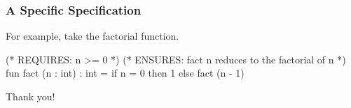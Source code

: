 \documentclass[aspectratio=169]{beamer}
\begin{document}
\begin{frame}[fragile]
  \frametitle{A Specific Specification}

  For example, take the factorial function.

  \vspace{\fill}

  \begin{codeblock}
    (* REQUIRES: n >= 0 *)
    (* ENSURES: fact n reduces to the factorial of n *)
    fun fact (n : int) : int = 
      if n = 0 then 
        1
      else 
        fact (n - 1) 
  \end{codeblock}
\end{frame}

\begin{frame}[plain]
	\begin{center} Thank you! \end{center}
\end{frame}
\end{document}
